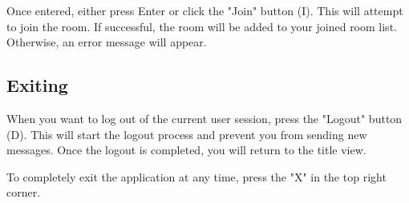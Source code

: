 \documentclass[titlepage]{scrartcl}
\begin{document}
Once entered, either press Enter or click the "Join" button (I). This will attempt to join the room. If successful, the room will be added to your joined room list. Otherwise, an error message will appear.

\subsection{Exiting}
When you want to log out of the current user session, press the "Logout" button (D). This will start the logout process and prevent you from sending new messages. Once the logout is completed, you will return to the title view.

To completely exit the application at any time, press the "X" in the top right corner.
\end{document}

